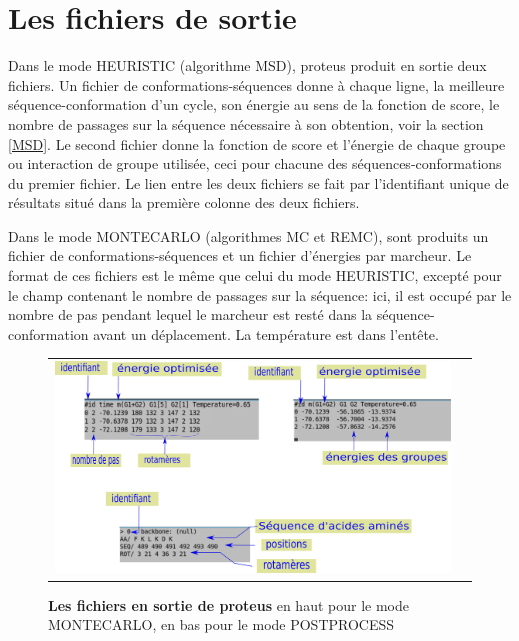 \section{Les fichiers de sortie}
\label{proteusIO}
Dans le mode HEURISTIC (algorithme MSD), proteus produit en sortie deux fichiers. Un fichier de conformations-séquences donne à chaque ligne, la meilleure séquence-conformation d'un cycle, son énergie au sens de la fonction de score, le nombre de passages sur la séquence nécessaire à son obtention, voir la section \vref{MSD}. Le second fichier donne la fonction de score et l'énergie de chaque groupe ou interaction de groupe utilisée, ceci pour chacune des séquences-conformations du premier fichier. Le lien entre les deux fichiers se fait par l'identifiant unique de résultats situé dans la première colonne des deux fichiers.

Dans le mode MONTECARLO (algorithmes MC et REMC), sont produits un fichier de conformations-séquences et un fichier d'énergies par marcheur. Le format de ces fichiers est le même que celui du mode HEURISTIC, excepté pour le champ contenant le nombre de passages sur la séquence: ici, il est occupé par le nombre de pas pendant lequel le marcheur est resté dans la séquence-conformation avant un déplacement. La température est dans l'entête.

   \begin{figure}[!htbp]
     \centering
     \begin{tabular}{cc}
       \includegraphics[width=14cm]{figure/output.png} &
     \end{tabular}
     
     \caption{\textbf{Les fichiers en sortie de proteus} en haut pour le mode MONTECARLO, en bas pour le mode POSTPROCESS}
\label{proteusoutput}
   \end{figure}

